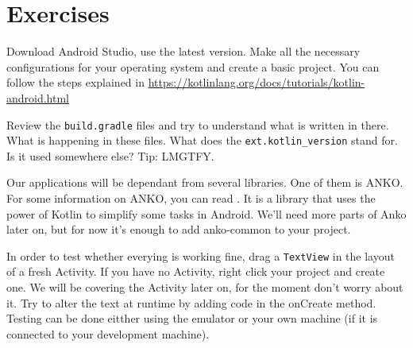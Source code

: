 \section{Exercises}
\begin{exercise}
	Download Android Studio, use the latest version.
	Make all the necessary configurations for your operating system and create a basic project.
	You can follow the steps explained in \url{https://kotlinlang.org/docs/tutorials/kotlin-android.html}
\end{exercise}

\begin{exercise}
	Review the \texttt{build.gradle} files and try to understand what is written in there.
	What is happening in these files.
	What does the \texttt{ext.kotlin\_version} stand for.
	Is it used somewhere else? Tip: LMGTFY.
\end{exercise}

 \begin{exercise}
 	Our applications will be dependant from several libraries.
	One of them is ANKO.
	For some information on ANKO, you can read \cite{Bukros2017}.
	It is  a library that uses the power of Kotlin to simplify some
 	tasks in Android.
	We’ll need more parts of Anko later on, but for now it’s enough to
	 	add anko-common to your project.
 \end{exercise}

\begin{exercise}
	In order to test whether everying is working fine, drag a \texttt{TextView} in the layout of a fresh Activity.
	If you have no Activity, right click your project and create one.
	We will be covering the Activity later on, for the moment don't worry about it.
	Try to alter the text at runtime by adding code in the onCreate method.
	Testing can be done eitther using the emulator or your own machine (if it is connected to your development machine).
\end{exercise}